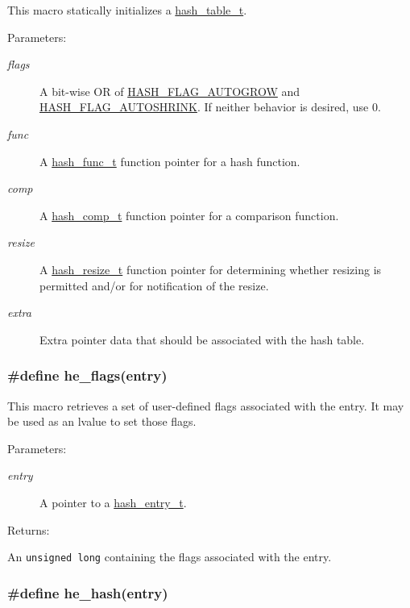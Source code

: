 This macro statically initializes a \hyperlink{group__dbprim__hash_a0}{hash\_\-table\_\-t}.\begin{Desc}
\item[Parameters: ]\par
\begin{description}
\item[{\em 
flags}]A bit-wise OR of \hyperlink{group__dbprim__hash_a16}{HASH\_\-FLAG\_\-AUTOGROW} and \hyperlink{group__dbprim__hash_a17}{HASH\_\-FLAG\_\-AUTOSHRINK}. If neither behavior is desired, use 0. \item[{\em 
func}]A \hyperlink{group__dbprim__hash_a3}{hash\_\-func\_\-t} function pointer for a hash function. \item[{\em 
comp}]A \hyperlink{group__dbprim__hash_a4}{hash\_\-comp\_\-t} function pointer for a comparison function. \item[{\em 
resize}]A \hyperlink{group__dbprim__hash_a5}{hash\_\-resize\_\-t} function pointer for determining whether resizing is permitted and/or for notification of the resize. \item[{\em 
extra}]Extra pointer data that should be associated with the hash table. \end{description}
\end{Desc}
\hypertarget{group__dbprim__hash_a32}{
\subsubsection[he\_\-flags]{\setlength{\rightskip}{0pt plus 5cm}\#define he\_\-flags(entry)}}
\label{group__dbprim__hash_a32}


This macro retrieves a set of user-defined flags associated with the entry. It may be used as an lvalue to set those flags.\begin{Desc}
\item[Parameters: ]\par
\begin{description}
\item[{\em 
entry}]A pointer to a \hyperlink{group__dbprim__hash_a1}{hash\_\-entry\_\-t}.\end{description}
\end{Desc}
\begin{Desc}
\item[Returns: ]\par
An {\tt unsigned long} containing the flags associated with the entry. \end{Desc}
\hypertarget{group__dbprim__hash_a34}{
\subsubsection[he\_\-hash]{\setlength{\rightskip}{0pt plus 5cm}\#define he\_\-hash(entry)}}
\label{group__dbprim__hash_a34}


